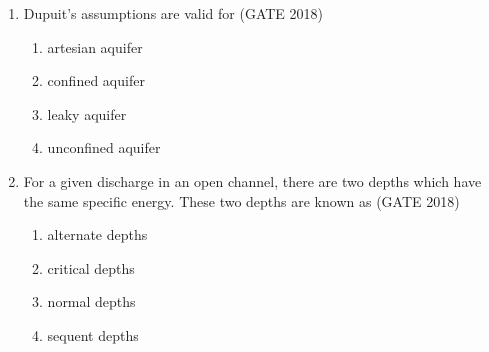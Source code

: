 \documentclass[journal,12pt,onecolumn]{IEEEtran}
\theoremstyle{remark}
\begin{document}
\begin{enumerate}
\item Dupuit's assumptions are valid for
\hfill{(GATE 2018)}
\begin{multicols}{4}
\begin{enumerate}
    \item artesian aquifer
    \item confined aquifer
    \item leaky aquifer
    \item unconfined aquifer
\end{enumerate}
\end{multicols}
\vspace{1cm}

\item For a given discharge in an open channel, there are two depths which have the same specific energy. These two depths are known as
\hfill{(GATE 2018)}
\begin{multicols}{4}
\begin{enumerate}
    \item alternate depths
    \item critical depths
    \item normal depths
    \item sequent depths
\end{enumerate}
\end{multicols}
\vspace{1cm}


\end{enumerate}
\end{document}
